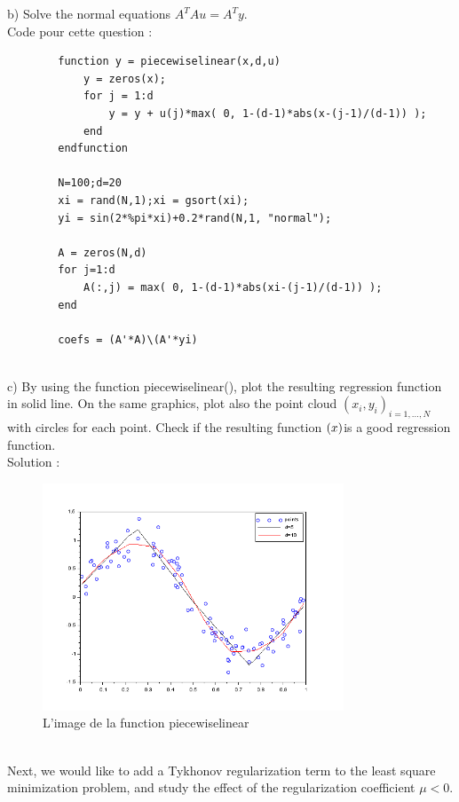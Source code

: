 \documentclass[11pt]{article}
\begin{document}
    \raggedright
    b) Solve the normal equations $A^T Au = A^T y$. \\
    Code pour cette question :
    \begin{verbatim}
        function y = piecewiselinear(x,d,u)
            y = zeros(x);
            for j = 1:d
                y = y + u(j)*max( 0, 1-(d-1)*abs(x-(j-1)/(d-1)) );
            end
        endfunction

        N=100;d=20
        xi = rand(N,1);xi = gsort(xi);
        yi = sin(2*%pi*xi)+0.2*rand(N,1, "normal");

        A = zeros(N,d)
        for j=1:d
            A(:,j) = max( 0, 1-(d-1)*abs(xi-(j-1)/(d-1)) );
        end

        coefs = (A'*A)\(A'*yi)
    \end{verbatim}
    ~\\

    c) By using the function piecewiselinear(), plot the resulting regression function in
    solid line. On the same graphics, plot also the point cloud $\left(x_i,y_i\right)_{i=1,\ldots,N}$ with circles for each point. Check if the resulting function $\title{f}(x)$is a good regression function.\\
    Solution : 
    \begin{figure}[H]
        \centering
        \includegraphics[width=0.8\textwidth,height=0.5\textwidth]{piece}
        \caption{L'image de la function piecewiselinear}
    \end{figure}

    ~\\
    Next, we would like to add a Tykhonov regularization term to the least square
    minimization problem, and study the effect of the regularization coefficient $\mu<0$.\\
    ~\\
\end{document}
